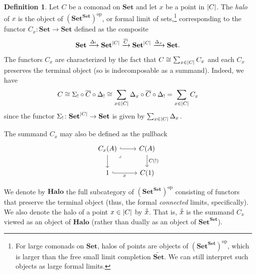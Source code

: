 \documentclass[11pt, oneside, article]{memoir}
\theoremstyle{plain}
\theoremstyle{definition}
\newtheorem{definition}[def]{Definition}
\theoremstyle{remark}
\DeclareMathOperator{\ophelper}{op}
\DeclarePairedDelimiter{\abs}{\lvert}{\rvert}
\newcommand{\op}{^{\ophelper}}
\newcommand{\xto}[1]{\xrightarrow{#1}}
\newcommand{\bang}{\mathrm{!}}
\newcommand{\namedcat}[1]{\mathbf{#1}}
\newcommand{\Halo}{\namedcat{Halo}}
\newcommand{\Set}{\namedcat{Set}}
\newcommand{\clift}[1]{\overline{#1}}
\newcommand{\pts}[1]{{\abs{#1}}}
\newcommand{\halo}[1]{\accentset{\circ}{#1}}
\newcommand{\reindex}[1]{\Delta_{#1}}
\newcommand{\slicel}{\Sigma_\bang}
\newcommand{\slicer}{\Delta_\bang}
\newcommand{\fun}[2]{{#2}^{#1}}
\newcommand{\End}[1]{\fun{#1}{#1}}
\newcommand{\SetSet}{\End{\Set}}
\newcommand{\cmnd}[1]{{#1}}
\newcommand{\xA}{A}
\newcommand{\cC}{\cmnd{C}}
\newcommand{\SetpC}{\Set^\pts{\cC}}
\begin{document}
\begin{definition}\label{def:halo}
  Let $\cC$ be a comonad on $\Set$ and let $x$ be a point in
  $\pts{\cC}$. The \emph{halo} of $x$ is the object of $(\SetSet)\op$,
  or formal limit of sets,\footnote{For large comonads on $\Set$, halos
    of points are objects of $(\SetSet)\op$, which is larger than the
    free small limit completion $\widetilde{\Set}$. We can still
    interpret such objects as large formal limits.} corresponding to
  the functor $\cC_x \colon \Set \to \Set$ defined as the composite
  \[
    \Set \xto{\slicer} \SetpC \xto{\clift{\cC}} \SetpC
    \xto{\reindex{x}} \Set.
  \]
  The functors $\cC_x$ are characterized by the fact that
  $\cC \cong \sum_{x \in \pts{\cC}} \cC_x$ and each $\cC_x$ preserves the
  terminal object (so is indecomposable as a summand). Indeed, we have
  \[\cC \cong \slicel \circ \clift{\cC} \circ \slicer \cong \sum_{x \in \pts{\cC}} \reindex{x} \circ \clift{\cC}
    \circ \slicer = \sum_{x \in \pts{\cC}} \cC_x\] since the functor
  $\slicel \colon \SetpC \to \Set$ is given by
  $\sum_{x \in \pts{\cC}} \reindex{x}$.

  The summand $\cC_x$ may also be defined as the pullback
  \[
    \begin{tikzcd}
      {\cC_x(\xA)} & {\cC(A)} \\
      1 & {\cC(1)}
      \arrow[hook, from=1-1, to=1-2]
      \arrow[from=1-1, to=2-1]
      \arrow["\lrcorner"{anchor=center, pos=0.125}, draw=none, from=1-1, to=2-2]
      \arrow["{\cC(\bang)}", from=1-2, to=2-2]
      \arrow["x"', hook, from=2-1, to=2-2]
    \end{tikzcd}
  \]

  We denote by $\Halo$ the full subcategory of $(\SetSet)\op$
  consisting of functors that preserve the terminal object (thus,
  the formal \emph{connected} limits, specifically). We also denote
  the halo of a point $x \in \pts{\cC}$ by $\halo{x}$. That is,
  $\halo{x}$ is the summand $\cC_x$ viewed as an object of $\Halo$
  (rather than dually as an object of $\SetSet$).
\end{definition}
\end{document}
